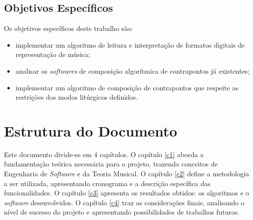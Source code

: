       \subsection*{Objetivos Específicos}

        Os objetivos específicos deste trabalho são:

        \begin{itemize}
          \item implementar um algoritmo de leitura e interpretação de formatos digitais de representação de música;
          \item analisar os \textit{softwares} de composição algorítmica de contrapontos já existentes;
          \item implementar um algoritmo de composição de contrapontos que respeite as restrições dos modos litúrgicos definidos.
        \end{itemize}

  \section*{Estrutura do Documento}

    Este documento divide-se em 4 capítulos. O capítulo \ref{c1} aborda a fundamentação teórica necessária para o projeto, trazendo conceitos de Engenharia de \textit{Software} e da Teoria Musical. O capítulo \ref{c2} define a metodologia a ser utilizada, apresentando cronograma e a descrição específica das funcionalidades. O capítulo \ref{c3} apresenta os resultados obtidos: os algoritmos e o \textit{software} desenvolvidos. O capítulo \ref{c4} traz as considerações finais, analisando o nível de sucesso do projeto e apresentando possibilidades de trabalhos futuros.
